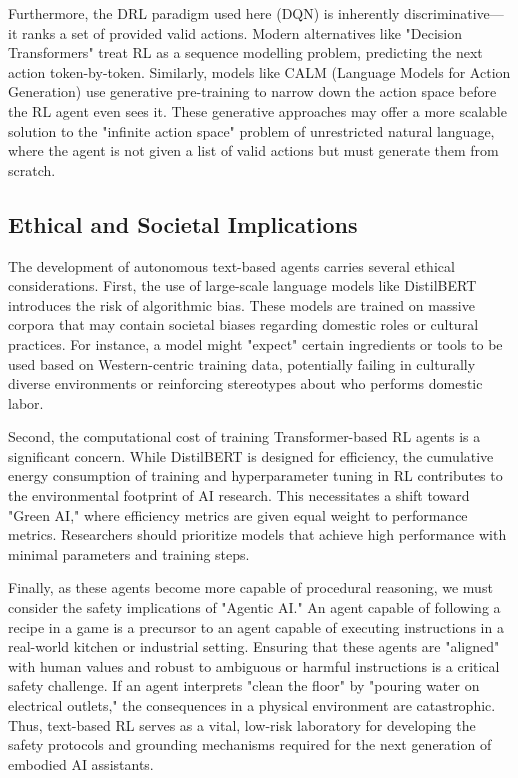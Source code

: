 \documentclass[11pt,a4paper]{article}
\begin{document}
Furthermore, the DRL paradigm used here (DQN) is inherently discriminative—it ranks a set of provided valid actions. Modern alternatives like "Decision Transformers" \citep{chen2021decision} treat RL as a sequence modelling problem, predicting the next action token-by-token. Similarly, models like CALM (Language Models for Action Generation) \citep{yao2020keep} use generative pre-training to narrow down the action space before the RL agent even sees it. These generative approaches may offer a more scalable solution to the "infinite action space" problem of unrestricted natural language, where the agent is not given a list of valid actions but must generate them from scratch.

\subsection{Ethical and Societal Implications}
The development of autonomous text-based agents carries several ethical considerations. First, the use of large-scale language models like DistilBERT introduces the risk of algorithmic bias. These models are trained on massive corpora that may contain societal biases regarding domestic roles or cultural practices. For instance, a model might "expect" certain ingredients or tools to be used based on Western-centric training data, potentially failing in culturally diverse environments or reinforcing stereotypes about who performs domestic labor.

Second, the computational cost of training Transformer-based RL agents is a significant concern. While DistilBERT is designed for efficiency, the cumulative energy consumption of training and hyperparameter tuning in RL contributes to the environmental footprint of AI research. This necessitates a shift toward "Green AI," where efficiency metrics are given equal weight to performance metrics. Researchers should prioritize models that achieve high performance with minimal parameters and training steps.

Finally, as these agents become more capable of procedural reasoning, we must consider the safety implications of "Agentic AI." An agent capable of following a recipe in a game is a precursor to an agent capable of executing instructions in a real-world kitchen or industrial setting. Ensuring that these agents are "aligned" with human values and robust to ambiguous or harmful instructions is a critical safety challenge. If an agent interprets "clean the floor" by "pouring water on electrical outlets," the consequences in a physical environment are catastrophic. Thus, text-based RL serves as a vital, low-risk laboratory for developing the safety protocols and grounding mechanisms required for the next generation of embodied AI assistants.
\end{document}
